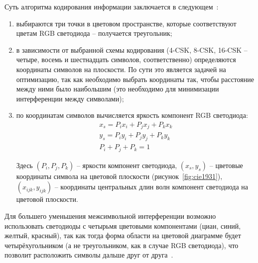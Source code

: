 Суть алгоритма кодирования информации заключается в следующем~\cite{IEEE2018}:

\begin{enumerate}
    \item выбираются три точки в цветовом пространстве, которые соответствуют цветам RGB светодиода \--- получается треугольник;
    \item в зависимости от выбранной схемы кодирования (4-CSK, 8-CSK, 16-CSK \--- четыре, восемь и шестнадцать символов, соответственно) определяются координаты символов на плоскости. По сути это является задачей на оптимизацию, так как необходимо выбрать координаты так, чтобы расстояние между ними было наибольшим (это необходимо для минимизации интерференции между символами);
    \item по координатам символов вычисляется яркость компонент RGB светодиода:
    \begin{equation}
        \begin{gathered}
            x_s = P_i x_i + P_j x_j + P_k x_k \\
            y_s = P_i y_i + P_j y_j + P_k y_k \\
            P_i + P_j + P_k = 1
        \end{gathered}
    \end{equation}

    Здесь $(P_i, P_j, P_k)$ \--- яркости компонент светодиода, $(x_s, y_s)$ \--- цветовые координаты символа на цветовой плоскости (рисунок~\ref{fig:cie1931}), $(x_{ijk}, y_{ijk})$ \--- координаты центральных длин волн компонент светодиода на цветовой плоскости. 
\end{enumerate}

Для большего уменьшения межсимвольной интерференции возможно использовать светодиоды с четырьмя цветовыми компонентами (циан, синий, желтый, красный), так как тогда форма области на цветовой диаграмме будет четырёхугольником (а не треугольником, как в случае RGB светодиода), что позволит расположить символы дальше друг от друга~\cite{Singh2014}.

